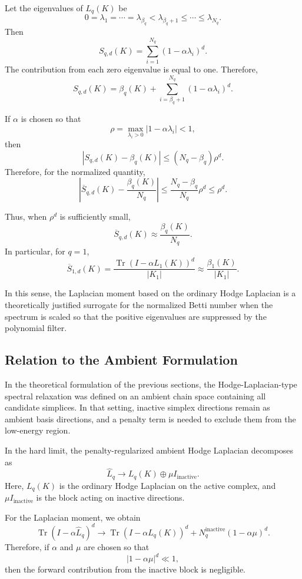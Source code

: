 \documentclass[pdflatex,sn-mathphys-ay]{sn-jnl}%
\theoremstyle{thmstyleone}%
\theoremstyle{thmstyletwo}%
\theoremstyle{thmstylethree}%
\begin{document}
Let the eigenvalues of \(L_q(K)\) be
\[
0=\lambda_1=\cdots=\lambda_{\beta_q}
<
\lambda_{\beta_q+1}
\le
\cdots
\le
\lambda_{N_q}.
\]
Then
\[
S_{q,d}(K)
=
\sum_{i=1}^{N_q}
(1-\alpha\lambda_i)^d.
\]
The contribution from each zero eigenvalue is equal to one. Therefore,
\[
S_{q,d}(K)
=
\beta_q(K)
+
\sum_{i=\beta_q+1}^{N_q}
(1-\alpha\lambda_i)^d.
\]

If \(\alpha\) is chosen so that
\[
\rho
=
\max_{\lambda_i>0}
|1-\alpha\lambda_i|
<
1,
\]
then
\[
\left|
S_{q,d}(K)-\beta_q(K)
\right|
\le
(N_q-\beta_q)\rho^d.
\]
Therefore, for the normalized quantity,
\[
\left|
\overline{S}_{q,d}(K)
-
\frac{\beta_q(K)}{N_q}
\right|
\le
\frac{N_q-\beta_q}{N_q}\rho^d
\le
\rho^d.
\]

Thus, when \(\rho^d\) is sufficiently small,
\[
\overline{S}_{q,d}(K)
\approx
\frac{\beta_q(K)}{N_q}.
\]
In particular, for \(q=1\),
\[
\overline{S}_{1,d}(K)
=
\frac{
\operatorname{Tr}
\left(
I-\alpha L_1(K)
\right)^d
}{
|K_1|
}
\approx
\frac{\beta_1(K)}{|K_1|}.
\]

In this sense, the Laplacian moment based on the ordinary Hodge Laplacian is a theoretically justified surrogate for the normalized Betti number when the spectrum is scaled so that the positive eigenvalues are suppressed by the polynomial filter.

\subsection{Relation to the Ambient Formulation}

In the theoretical formulation of the previous sections, the Hodge-Laplacian-type spectral relaxation was defined on an ambient chain space containing all candidate simplices. In that setting, inactive simplex directions remain as ambient basis directions, and a penalty term is needed to exclude them from the low-energy region.

In the hard limit, the penalty-regularized ambient Hodge Laplacian decomposes as
\[
\widehat{L}_q
\to
L_q(K)
\oplus
\mu I_{\mathrm{inactive}}.
\]
Here, \(L_q(K)\) is the ordinary Hodge Laplacian on the active complex, and \(\mu I_{\mathrm{inactive}}\) is the block acting on inactive directions.

For the Laplacian moment, we obtain
\[
\operatorname{Tr}
\left(
I-\alpha \widehat{L}_q
\right)^d
\to
\operatorname{Tr}
\left(
I-\alpha L_q(K)
\right)^d
+
N_q^{\mathrm{inactive}}
(1-\alpha\mu)^d.
\]
Therefore, if \(\alpha\) and \(\mu\) are chosen so that
\[
|1-\alpha\mu|^d\ll 1,
\]
then the forward contribution from the inactive block is negligible.
\end{document}
